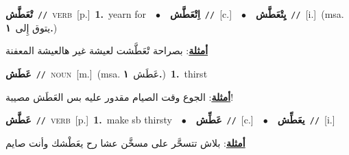 \documentclass[10pt,a4paper,twoside]{article} %
\begin{document}
\begin{multicols}{2}
{\setlength\topsep{0pt}\textbf{\foreignlanguage{arabic}{تْعَطَّش}}\ {\color{gray}\texttt{//}\color{black}}\ \textsc{verb}\ [p.]\ \textbf{1.}~yearn for\ \ $\bullet$\ \ \setlength\topsep{0pt}\textbf{\foreignlanguage{arabic}{اِتْعَطَّش}}\ {\color{gray}\texttt{//}\color{black}}\ [c.]\ \ $\bullet$\ \ \setlength\topsep{0pt}\textbf{\foreignlanguage{arabic}{يِتْعَطَّش}}\ {\color{gray}\texttt{//}\color{black}}\ [i.]\ \color{gray}(msa. \foreignlanguage{arabic}{يتوق إِلى}~\foreignlanguage{arabic}{\textbf{١.}})\color{black}\  \begin{flushright}\color{gray}\foreignlanguage{arabic}{\textbf{\underline{\foreignlanguage{arabic}{أمثلة}}}: بصراحة تْعَطَّشت لعيشة غير هالعيشة المعفنة}\end{flushright}\color{black}} \vspace{2mm}

{\setlength\topsep{0pt}\textbf{\foreignlanguage{arabic}{عَطَش}}\ {\color{gray}\texttt{//}\color{black}}\ \textsc{noun}\ [m.]\ \color{gray}(msa. \foreignlanguage{arabic}{عَطَش}~\foreignlanguage{arabic}{\textbf{١.}})\color{black}\ \textbf{1.}~thirst\  \begin{flushright}\color{gray}\foreignlanguage{arabic}{\textbf{\underline{\foreignlanguage{arabic}{أمثلة}}}: الجوع وقت الصيام مقدور عليه بس العَطَش مصيبة!}\end{flushright}\color{black}} \vspace{2mm}

{\setlength\topsep{0pt}\textbf{\foreignlanguage{arabic}{عَطَّش}}\ {\color{gray}\texttt{//}\color{black}}\ \textsc{verb}\ [p.]\ \textbf{1.}~make sb thirsty\ \ $\bullet$\ \ \setlength\topsep{0pt}\textbf{\foreignlanguage{arabic}{عَطِّش}}\ {\color{gray}\texttt{//}\color{black}}\ [c.]\ \ $\bullet$\ \ \setlength\topsep{0pt}\textbf{\foreignlanguage{arabic}{يعَطِّش}}\ {\color{gray}\texttt{//}\color{black}}\ [i.]\  \begin{flushright}\color{gray}\foreignlanguage{arabic}{\textbf{\underline{\foreignlanguage{arabic}{أمثلة}}}: بلاش تتسحَّر على مسخَّن عشا رح يعَطْشك وأنت صايم}\end{flushright}\color{black}} \vspace{2mm}


\end{multicols}
\end{document}
